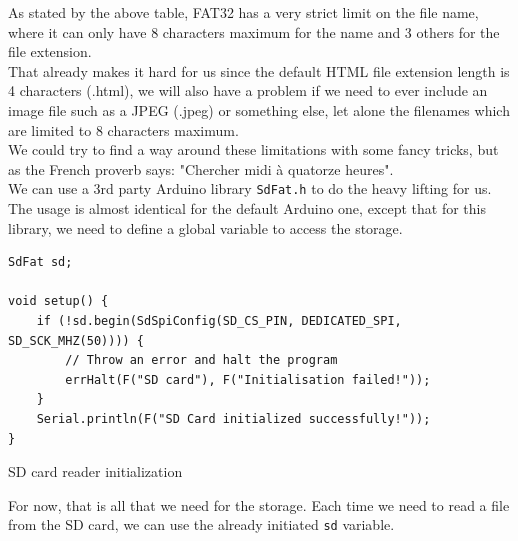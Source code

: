 As stated by the above table, FAT32 has a very strict limit on the file name, where it can only have 8 characters maximum for the name and 3 others for the file extension.\\
That already makes it hard for us since the default HTML file extension length is 4 characters (.html), we will also have a problem if we need to ever include an image file such as a JPEG (.jpeg) or something else, let alone the filenames which are limited to 8 characters maximum. \\

We could try to find a way around these limitations with some fancy tricks, but  as the French proverb says: "Chercher midi à quatorze heures". \\

We can use a 3rd party Arduino library \verb|SdFat.h| to do the heavy lifting for us. The usage is almost identical for the default Arduino one, except that for this library, we need to define a global variable to access the storage.

\begin{code}
    \begin{verbatim}
SdFat sd;

void setup() {
    if (!sd.begin(SdSpiConfig(SD_CS_PIN, DEDICATED_SPI, SD_SCK_MHZ(50)))) {
        // Throw an error and halt the program
        errHalt(F("SD card"), F("Initialisation failed!")); 
    }
    Serial.println(F("SD Card initialized successfully!"));
}
    \end{verbatim}
    \caption{SD card reader initialization}
\end{code}

For now, that is all that we need for the storage. Each time we need to read a file from the SD card, we can use the already initiated \verb|sd| variable.

